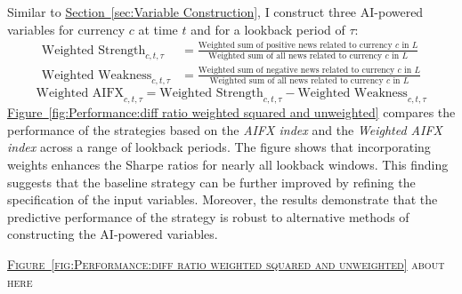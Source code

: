 \documentclass[12pt,oneside,letter]{article}
\newcommand*{\myfig}[1]{\hyperref[{#1}]{Figure~\ref*{#1}}}
\newcommand*{\mysec}[1]{\hyperref[{#1}]{Section~\ref*{#1}}}
\begin{document}
		\vspace{-20pt}\begin{examples}[H] 
			\centering
			\caption{}
			\label{examples:Performance:Weighting example II}
		\end{examples}
		\vspace{-20pt}Similar to \mysec{sec:Variable Construction}, I construct three AI-powered variables for currency \(c\) at time \(t\) and for a lookback period of \(\tau\):
		\begin{align*}
			\text{Weighted Strength}_{c,t,\tau} 
			&= \frac{\text{Weighted sum of positive news related to currency $c$ in $L$}}{\text{Weighted sum of all news related to currency $c$ in $L$}} 
			\\[10pt]
			\text{Weighted Weakness}_{c,t,\tau} 
			&= \frac{\text{Weighted sum of negative news related to currency $c$ in $L$}}{\text{Weighted sum of all news related to currency $c$ in $L$}}
		\end{align*}
		\vspace*{-20pt}
		\begin{equation}
			\text{Weighted AIFX}_{c,t,\tau} = \text{Weighted Strength}_{c,t,\tau} - \text{Weighted Weakness}_{c,t,\tau}
			\label{eq:Performance:definition of weighted diff ratio}
		\end{equation}
		\myfig{fig:Performance:diff ratio weighted squared and unweighted} compares the performance of the strategies based on the \textit{AIFX index} and the \textit{Weighted AIFX index} across a range of lookback periods. The figure shows that incorporating weights enhances the Sharpe ratios for nearly all lookback windows. This finding suggests that the baseline strategy can be further improved by refining the specification of the input variables. Moreover, the results demonstrate that the predictive performance of the strategy is robust to alternative methods of constructing the AI-powered variables.
		\begin{center}
			\textsc{\myfig{fig:Performance:diff ratio weighted squared and unweighted} about here}  
		\end{center}
		
\end{document}
